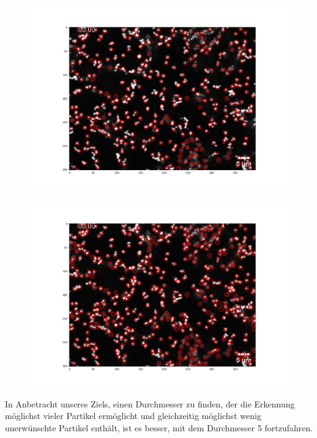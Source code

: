 \begin{enumerate}
\begin{figure}[H]
    \centering
    \begin{minipage}{.5\textwidth}
     	\centering
  	  	\includegraphics[scale=0.3]{Grafiken/trackpyBilder/locate(frames[0], 7).png}
 		\label{fig:test1}
    \end{minipage}
	
	\begin{minipage}{.5\textwidth}
     	\centering
  	  	\includegraphics[scale=0.3]{Grafiken/trackpyBilder/locate(frames[0], 5).png}
 		 \label{fig:test2}
    \end{minipage}
\end{figure}

In Anbetracht unseres Ziels, einen Durchmesser zu finden, der die Erkennung möglichst vieler Partikel ermöglicht und gleichzeitig möglichst wenig unerwünschte Partikel enthält, ist es besser, mit dem Durchmesser 5 fortzufahren. 


\end{enumerate}

